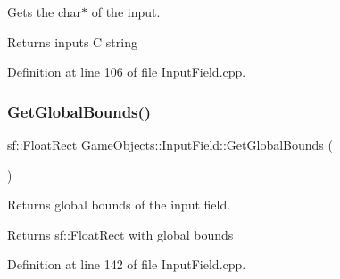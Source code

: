 Gets the char$\ast$ of the input. 

\begin{DoxyReturn}{Returns}
input\textquotesingle{}s C string \begin{DoxyVerb}\end{DoxyVerb}
 
\end{DoxyReturn}


Definition at line 106 of file Input\+Field.\+cpp.


\begin{DoxyCode}{0}

\end{DoxyCode}
\mbox{\label{class_game_objects_1_1_input_field_af629e9c792ccfdcc64ab807b9b30a5ac}} 
\subsubsection{\texorpdfstring{GetGlobalBounds()}{GetGlobalBounds()}}
{\footnotesize\ttfamily sf\+::\+Float\+Rect Game\+Objects\+::\+Input\+Field\+::\+Get\+Global\+Bounds (\begin{DoxyParamCaption}{ }\end{DoxyParamCaption})}



Returns global bounds of the input field. 

\begin{DoxyReturn}{Returns}
sf\+::\+Float\+Rect with global bounds \begin{DoxyVerb}\end{DoxyVerb}
 
\end{DoxyReturn}


Definition at line 142 of file Input\+Field.\+cpp.


\begin{DoxyCode}{0}

\end{DoxyCode}
\mbox{\label{class_game_objects_1_1_input_field_a24c8b48b7311a4bf6112359c5a0d50c6}} 
